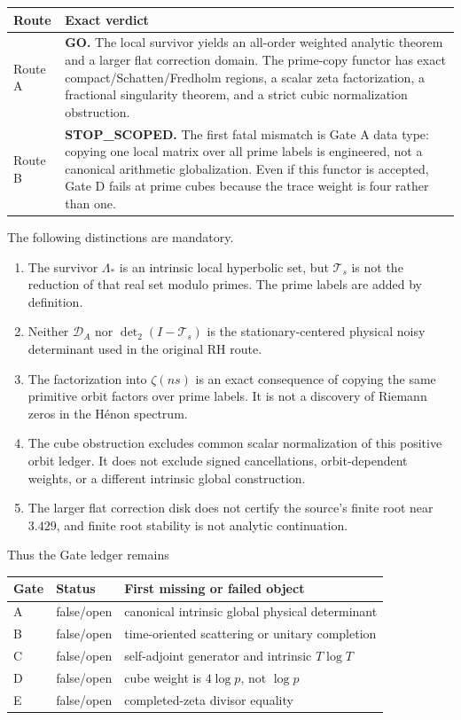 \documentclass[11pt]{article}
\numberwithin{equation}{section}
\theoremstyle{remark}
\newcommand{\cT}{\mathcal T}
\newcommand{\cD}{\mathcal D}
\newcommand{\Lam}{\Lambda}
\begin{document}
\begin{center}
\begin{tabular}{p{}p{}}
\toprule
Route & Exact verdict \\
\midrule
Route A & \textbf{GO.}  The local survivor yields an all-order weighted
analytic theorem and a larger flat correction domain.  The prime-copy functor
has exact compact/Schatten/Fredholm regions, a scalar zeta factorization, a
fractional singularity theorem, and a strict cubic normalization obstruction.\\
Route B & \textbf{STOP\_SCOPED.}  The first fatal mismatch is Gate A data
type: copying one local matrix over all prime labels is engineered, not a
canonical arithmetic globalization.  Even if this functor is accepted, Gate
D fails at prime cubes because the trace weight is four rather than one.\\
\bottomrule
\end{tabular}
\end{center}

The following distinctions are mandatory.
\begin{enumerate}
\item The survivor \(\Lam_*\) is an intrinsic local hyperbolic set, but
\(\cT_s\) is not the reduction of that real set modulo primes.  The prime
labels are added by definition.
\item Neither \(\cD_A\) nor \(\det_2(I-\cT_s)\) is the stationary-centered
physical noisy determinant used in the original RH route.
\item The factorization into \(\zeta(ns)\) is an exact consequence of copying
the same primitive orbit factors over prime labels.  It is not a discovery of
Riemann zeros in the H\'enon spectrum.
\item The cube obstruction excludes common scalar normalization of this
positive orbit ledger.  It does not exclude signed cancellations,
orbit-dependent weights, or a different intrinsic global construction.
\item The larger flat correction disk does not certify the source's finite
root near \(3.429\), and finite root stability is not analytic continuation.
\end{enumerate}

Thus the Gate ledger remains
\begin{center}
\begin{tabular}{lll}
\toprule
Gate & Status & First missing or failed object \\
\midrule
A & false/open & canonical intrinsic global physical determinant \\
B & false/open & time-oriented scattering or unitary completion \\
C & false/open & self-adjoint generator and intrinsic \(T\log T\) \\
D & false/open & cube weight is \(4\log p\), not \(\log p\) \\
E & false/open & completed-zeta divisor equality \\
\bottomrule
\end{tabular}
\end{center}
\end{document}
